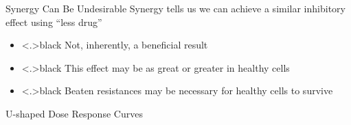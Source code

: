 \documentclass{beamer}
\begin{document}
\begin{frame}{Synergy Can Be Undesirable}
    Synergy tells us we can achieve a similar inhibitory effect using ``less drug''
    \begin{itemize}[<+->]\color{gray}
        \item \color<.>{black} Not, inherently, a beneficial result
        \item \color<.>{black} This effect may be as great or greater in healthy cells 
        \item \color<.>{black} Beaten resistances may be necessary for healthy cells to survive
    \end{itemize}
    \vfill 
\end{frame}

\begin{frame}{U-shaped Dose Response Curves}
    \centering
\end{frame}
\end{document}
